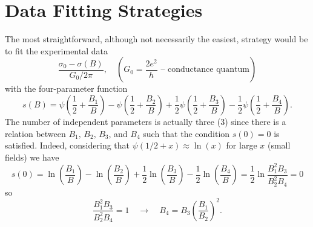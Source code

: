 \documentclass[11pt]{article} %
\begin{document}
\section{Data Fitting Strategies}
The most straightforward, although not necessarily the easiest, strategy would be to fit the experimental data
\begin{equation}
	\frac{\sigma_0 - \sigma(B)}{G_0/2\pi},\quad (G_0 = \frac{2e^2}{h}\textrm{ -- conductance quantum})
\end{equation}
with the four-parameter function
\begin{equation}
	s(B) = \psi\left(\frac{1}{2}+\frac{B_1}{B}\right)-\psi\left(\frac{1}{2}+\frac{B_2}{B}\right)+\frac{1}{2}\psi\left(\frac{1}{2}+\frac{B_3}{B}\right)-\frac{1}{2}\psi\left(\frac{1}{2}+\frac{B_4}{B}\right).
\end{equation}
The number of independent parameters is actually three (3) since there is a relation between $B_1,\, B_2,\,B_3$, and $B_4$ such that the condition $s(0) = 0$ is satisfied. Indeed, considering that $\psi(1/2+x) \approx \ln(x)$ for large $x$ (small fields) we have
\begin{equation}
	s(0) = \ln\left(\frac{B_1}{B}\right)-\ln\left(\frac{B_2}{B}\right)+\frac{1}{2}\ln\left(\frac{B_3}{B}\right)-\frac{1}{2}\ln\left(\frac{B_4}{B}\right) = \frac{1}{2}\ln\frac{B_1^2B_3}{B_2^2B_4} = 0
\end{equation}
so
\begin{equation}
	\frac{B_1^2B_3}{B_2^2B_4} = 1\quad\rightarrow\quad B_4 = B_3\left(\frac{B_1}{B_2}\right)^2.
\end{equation}

									
\end{document}
